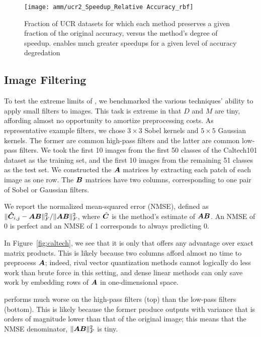 \begin{figure}[h]
\begin{center}
\texttt{[image: amm/ucr2\_Speedup\_Relative Accuracy\_rbf]}
\caption{Fraction of UCR datasets for which each method preserves a given fraction of the original accuracy, versus the method's degree of speedup. \oursp enables much greater speedups for a given level of accuracy degredation}
\label{fig:ucr}
\end{center}
\end{figure}

\subsection{Image Filtering}

To test the extreme limits of \ours, we benchmarked the various techniques' ability to apply small filters to images. This task is extreme in that $D$ and $M$ are tiny, affording almost no opportunity to amortize preprocessing costs. As representative example filters, we chose $3 \times 3$ Sobel kernels and $5 \times 5$ Gaussian kernels. The former are common high-pass filters and the latter are common low-pass filters. We took the first 10 images from the first 50 classes of the Caltech101 dataset as the training set, and the first 10 images from the remaining 51 classes as the test set. We constructed the $\bm{A}$ matrices by extracting each patch of each image as one row. The $\bm{B}$ matrices have two columns, corresponding to one pair of Sobel or Gaussian filters.


We report the normalized mean-squared error (NMSE), defined as $\lVert\bm{\hat{C}}_{i,j} - \bm{A}\bm{B}\rVert^2_F / \lVert\bm{A}\bm{B}\rVert^2_F$, where $\hat{\bm{C}}$ is the method's estimate of $\bm{A}\bm{B}$. An NMSE of 0 is perfect and an NMSE of 1 corresponds to always predicting 0.

In Figure~\ref{fig:caltech}, we see that it is only \oursp that offers any advantage over exact matrix products. This is likely because two columns afford almost no time to preprocess $\bm{A}$; indeed, rival vector quantization methods cannot logically do less work than brute force in this setting, and dense linear methods can only save work by embedding rows of $\bm{A}$ in one-dimensional space.

\oursp performs much worse on the high-pass filters (top) than the low-pass filters (bottom). This is likely because the former produce outputs with variance that is orders of magnitude lower than that of the original image; this means that the NMSE denominator, $\lVert\bm{A}\bm{B}\rVert^2_F$ is tiny.  %

